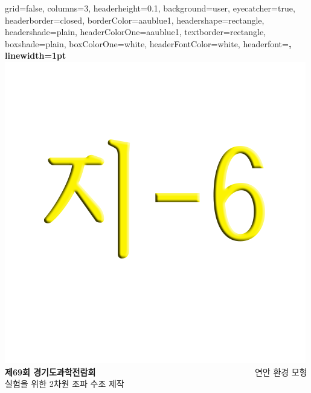 \documentclass[a0paper,portrait]{baposter}
\begin{document}
\begin{poster}{
  grid=false,
  columns=3,
  headerheight=0.1\textheight,
  background=user,
  eyecatcher=true,
  headerborder=closed,
  borderColor=aaublue1,
  headershape=rectangle,
  headershade=plain,
  headerColorOne=aaublue1,
  textborder=rectangle,
  boxshade=plain,
  boxColorOne=white,
  headerFontColor=white,
  headerfont=\Large\sf\bf,
  linewidth=1pt
}
{
  \includegraphics[height=0.75\headerheight]{images/gshslogo1.png}
}
{\color{white}\bf \Large
제69회 경기도과학전람회 $~~~~~~~~~~~~~~~~~~~~~~~~~~~~~~~~~~~~~~~~~~~~~~~~~~~~~~~~~~~~~~~~~~~~~~~~~~~~~~~~~~$      
}
{\color{white}\LARGE
  \vspace{1em} 연안 환경 모형 실험을 위한 2차원 조파 수조 제작 }
{
}


\end{poster}
\end{document}
